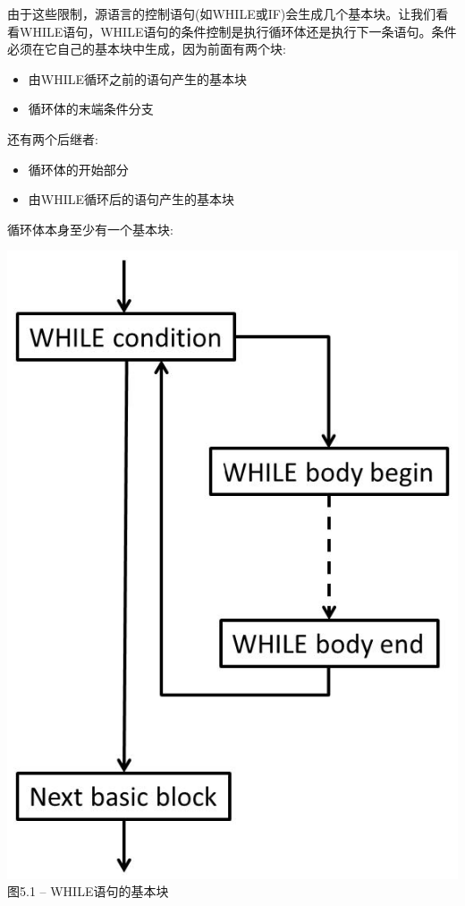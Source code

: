 由于这些限制，源语言的控制语句(如WHILE或IF)会生成几个基本块。让我们看看WHILE语句，WHILE语句的条件控制是执行循环体还是执行下一条语句。条件必须在它自己的基本块中生成，因为前面有两个块:\par

\begin{itemize}
	\item 由WHILE循环之前的语句产生的基本块
	\item 循环体的末端条件分支
\end{itemize}

还有两个后继者:\par

\begin{itemize}
	\item 循环体的开始部分
	\item 由WHILE循环后的语句产生的基本块
\end{itemize}

循环体本身至少有一个基本块:\par

\hspace*{\fill} \par %
\begin{center}
	\includegraphics{content/2/chapter5/images/1.jpg}\\
	图5.1 – WHILE语句的基本块
\end{center}

